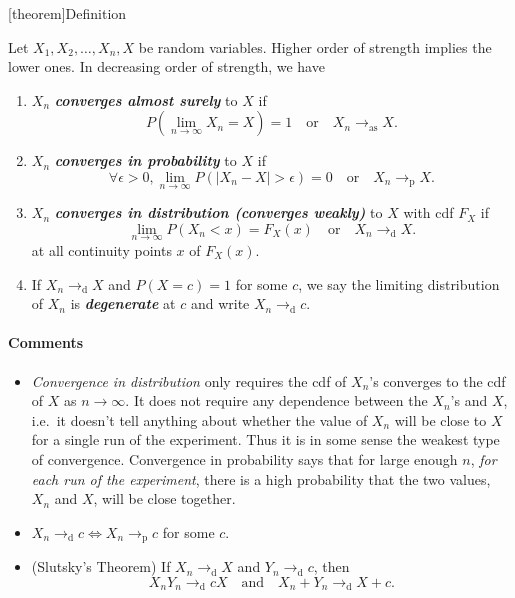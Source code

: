 \documentclass[12pt]{report}
\theoremstyle{definition}
\begin{document}
[theorem]{Definition}
\begin{Xn convergence strength}
    Let $X_1,X_2,\ldots,X_n, X$ be random variables.
    Higher order of strength implies the lower ones.
    In decreasing order of strength, we have
    \begin{enumerate}
        \item $X_n$ \textbf{\emph{converges almost surely}} to $X$ if
            \[
                P(\lim_{n\rightarrow\infty}X_n=X)=1
                \quad\text{or}\quad
                X_n\rightarrow_\text{as}X.
            \]
        \item $X_n$ \textbf{\emph{converges in probability}} to $X$ if
            \[
                \forall \epsilon>0,
                \lim_{n\rightarrow\infty}P(|X_n-X|>\epsilon)=0
                \quad\text{or}\quad 
                X_n\rightarrow_\text{p}X.
            \]
        \item $X_n$ \textbf{\emph{converges in distribution (converges weakly)}} to $X$ with cdf
            $F_X$ if
            \[
                \lim_{n\rightarrow\infty}P(X_n<x)=F_X(x)
                \quad\text{or}\quad
                X_n\rightarrow_\text{d}X.
            \]
            at all continuity points $x$ of $F_X(x)$.
        \item If $X_n\rightarrow_\text{d}X$ and $P(X=c)=1$ for some $c$, we say
            the limiting distribution of $X_n$ is \textbf{\emph{degenerate}} at
            $c$ and write $X_n\rightarrow_\text{d}c$.
    \end{enumerate} 
\end{Xn convergence strength}
\paragraph{Comments}
\begin{itemize}
    \item 
        \emph{Convergence in distribution} only requires the cdf of $X_n$'s converges to
        the cdf of $X$ as $n\rightarrow\infty$. It does not require any dependence
        between the $X_n$'s and $X$, i.e.\ it doesn't tell anything about whether the
        value of $X_n$ will be close to $X$ for a single run of the experiment.
        Thus it is in some sense the weakest type of convergence.
        Convergence in probability says that for large enough $n$, \emph{for each run of
        the experiment}, there is a high probability that the two values, $X_n$ and $X$,
        will be close together.
    \item $X_n\rightarrow_\text{d} c \iff X_n\rightarrow_\text{p}c$ for some
        $c$.
    \item (Slutsky's Theorem) If $X_n\rightarrow_\text{d}X$ and
        $Y_n\rightarrow_\text{d}c$, then
        \[
            X_nY_n\rightarrow_\text{d}cX\quad\text{and}\quad
            X_n+Y_n\rightarrow_\text{d}X+c.
        \]
\end{itemize} 
\end{document}
